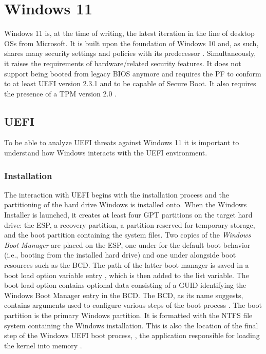 

\chapter{Windows 11}
\label{sec:windows}

Windows 11 is, at the time of writing, the latest iteration in the line of desktop \acp{OS} from Microsoft.
It is built upon the foundation of Windows 10 and, as such, shares many security settings and policies with its predecessor \cite{microsoft-windows-11-overview}.
Simultaneously, it raises the requirements of hardware\-/related security features.
It does not support being booted from legacy \ac{BIOS} anymore and requires the \ac{PF} to conform to at least \ac{UEFI} version 2.3.1 and to be capable of Secure Boot.
It also requires the presence of a \ac{TPM} version 2.0 \cite{microsoft-windows-minimum-hardware-requirements-overview}.

\section{\acs{UEFI}}

To be able to analyze \ac{UEFI} threats against Windows 11 it is important to understand how Windows interacts with the \ac{UEFI} environment.

\subsection{Installation}

The interaction with \ac{UEFI} begins with the installation process and the partitioning of the hard drive Windows is installed onto.
When the Windows Installer is launched, it creates at least four \ac{GPT} partitions on the target hard drive: the \acf{ESP}, a recovery partition, a partition reserved for temporary storage, and the boot partition containing the system files.
Two copies of the \emph{Windows Boot Manager}  are placed on the \ac{ESP}, one under  for the default boot behavior (i.e., booting from the installed hard drive) and one under  alongside boot resources such as the \ac{BCD}.
The path of the latter boot manager is saved in a boot load option variable entry , which is then added to the  list variable.
The boot load option contains optional data consisting of a \ac{GUID} identifying the Windows Boot Manager entry in the \ac{BCD}.
The \ac{BCD}, as its name suggests, contains arguments used to configure various steps of the boot process \cite[Section 12]{windows-internals-7-part2}.
The boot partition is the primary Windows partition.
It is formatted with the \ac{NTFS} file system containing the Windows installation.
This is also the location of the final step of the Windows \ac{UEFI} boot process, , the application responsible for loading the kernel into memory \cite[Section 12]{windows-internals-7-part2}.

